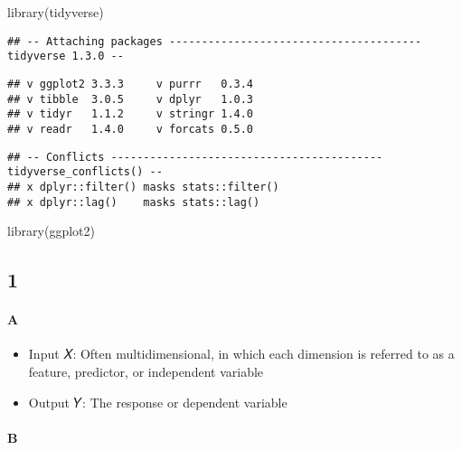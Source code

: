 \documentclass[
]{article}
\newenvironment{Shaded}{\begin{snugshade}}{\end{snugshade}}
\newcommand{\FunctionTok}[1]{\textcolor[rgb]{0.00,0.00,0.00}{#1}}
\newcommand{\NormalTok}[1]{#1}
\providecommand{\tightlist}{%
  \setlength{\itemsep}{0pt}\setlength{\parskip}{0pt}}
\begin{document}
\begin{Shaded}
\begin{Highlighting}[]
\FunctionTok{library}\NormalTok{(tidyverse)}
\end{Highlighting}
\end{Shaded}

\begin{verbatim}
## -- Attaching packages --------------------------------------- tidyverse 1.3.0 --
\end{verbatim}

\begin{verbatim}
## v ggplot2 3.3.3     v purrr   0.3.4
## v tibble  3.0.5     v dplyr   1.0.3
## v tidyr   1.1.2     v stringr 1.4.0
## v readr   1.4.0     v forcats 0.5.0
\end{verbatim}

\begin{verbatim}
## -- Conflicts ------------------------------------------ tidyverse_conflicts() --
## x dplyr::filter() masks stats::filter()
## x dplyr::lag()    masks stats::lag()
\end{verbatim}

\begin{Shaded}
\begin{Highlighting}[]
\FunctionTok{library}\NormalTok{(ggplot2)}
\end{Highlighting}
\end{Shaded}

\hypertarget{section}{%
\subsection{1}\label{section}}

\hypertarget{a}{%
\paragraph{A}\label{a}}

\begin{itemize}
\tightlist
\item
  Input 𝑋: Often multidimensional, in which each dimension is referred
  to as a feature, predictor, or independent variable
\item
  Output 𝑌: The response or dependent variable
\end{itemize}

\hypertarget{b}{%
\paragraph{B}\label{b}}
\end{document}
